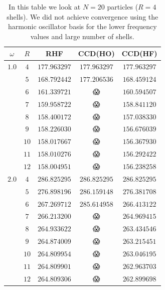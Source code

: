 \documentclass[
    a4paper, aps, twocolumn, floatfix, superscriptaddress,
    nofootinbib]{revtex4-1}
\newcommand{\nan}{\DejaSans 😱}
\newcommand{\1}{\mathds{1}}
\begin{document}
        \begin{table}
            \centering
            \caption{In this table we look at $N = 20$ particles ($R = 4$ shells).
            We did not achieve convergence using the harmonic oscillator basis for
            the lower frequency values and large number of shells.}
            \begin{ruledtabular}
                \begin{tabular}{c|c|ccc}
                    $\omega$ & $R$ & RHF & CCD(HO) & CCD(HF) \\
                    \hline
                    $1.0$ & $4$ & $177.963297$ & $177.963297$ & $177.963297$ \\
                          & $5$ & $168.792442$ & $177.206536$ & $168.459124$ \\
                          & $6$ & $161.339721$ & \nan & $160.594507$ \\
                          & $7$ & $159.958722$ & \nan & $158.841120$ \\
                          & $8$ & $158.400172$ & \nan & $157.038330$ \\
                          & $9$ & $158.226030$ & \nan & $156.676039$ \\
                          & $10$ & $158.017667$ & \nan & $156.367930$ \\
                          & $11$ & $158.010276$ & \nan & $156.292422$ \\
                          & $12$ & $158.004951$ & \nan & $156.238258$ \\
                    \hline
                    $2.0$ & $4$ & $286.825295$ & $286.825295$ & $286.825295$ \\
                          & $5$ & $276.898196$ & $286.159148$ & $276.381708$ \\
                          & $6$ & $267.269712$ & $285.614958$ & $266.413122$ \\
                          & $7$ & $266.213200$ & \nan & $264.969415$ \\
                          & $8$ & $264.933622$ & \nan & $263.434546$ \\
                          & $9$ & $264.874009$ & \nan & $263.215451$ \\
                          & $10$ & $264.809954$ & \nan & $263.046195$ \\
                          & $11$ & $264.809901$ & \nan & $262.963703$ \\
                          & $12$ & $264.809306$ & \nan & $262.899698$ \\

\end{tabular}
\end{ruledtabular}
\end{table}
\end{document}

